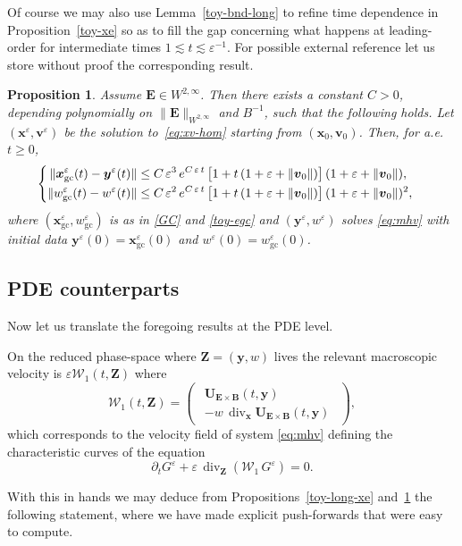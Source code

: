 \documentclass[10pt]{amsart}
\let\mathcal\mathscr
\newenvironment{splitcases}
{\begin{cases}\begin{aligned}}
{\end{aligned}\end{cases}}
\let\eps\varepsilon
\let\d\partial
\DeclareMathOperator{\Div}{div}
\theoremstyle{plain}
\newtheorem{proposition}[theorem]{Proposition}
\theoremstyle{definition}
\newcommand\bp{\begin{pmatrix}}
\newcommand\ep{\end{pmatrix}}
\newcommand{\be}{\begin{equation}}
\newcommand{\ee}{\end{equation}}
\newcommand{\ba}[1]{\begin{array}{#1}}
\newcommand{\ea}{\end{array}}
\newcommand{\bpr}{\begin{proposition}}
\newcommand{\epr}{\end{proposition}}
\newcommand\bB{{\boldsymbol B}}
\newcommand\bE{{\boldsymbol E}}
\newcommand\bU{{\boldsymbol U}}
\newcommand\bfv{{\boldsymbol v}}
\newcommand\bfx{{\boldsymbol x}}
\newcommand\bfy{{\boldsymbol y}}
\newcommand\bfZ{{\boldsymbol Z}}
\newcommand\cW{{\mathcal W}}
\let\e w
\newcommand{\GC}{\bfx_\mathrm{gc}}
\newcommand{\eGC}{w_\mathrm{gc}}
\newcommand{\EcB}{\bU_{\bE\times\bB}}
\begin{document}
Of course we may also use Lemma~\ref{toy-bnd-long} to refine time dependence in Proposition~\ref{toy-xe} so as to fill the gap concerning what happens at leading-order for intermediate times $1\lesssim t\lesssim \eps^{-1}$. For possible external reference let us store without proof the corresponding result.

\bpr
\label{toy-bis-xe}
Assume $\bE\in W^{2,\infty}$. Then there exists a constant $C>0$, depending
polynomially on $\|\bE\|_{W^{2,\infty}}$ and $B^{-1}$, such that the following holds. Let
$(\bfx^\eps,\bfv^\eps)$ be the solution to~\eqref{eq:xv-hom} starting from
$(\bfx_0,\bfv_0)$. Then, for a.e. $t\geq0$,
\[
\begin{splitcases}
\|\GC^\eps(t)-\bfy^\eps(t)\| &\leq C\,\eps^3\,e^{C\,\eps\,t}
\,\bigl[1+t\,(1+\eps+\|\bfv_0\|)\bigr]\,(1+\eps+\|\bfv_0\|),
\\
\|\eGC^\eps(t)-\e^\eps(t)\|&\leq C\,\eps^2\,e^{C\,\eps\,t}\,
\bigl[1+t\,(1+\eps+\|\bfv_0\|)\bigr]\,(1+\eps+\|\bfv_0\|)^2,
\end{splitcases}
\]
where $(\GC^\eps,\eGC^\eps)$ is as in \eqref{GC} and \eqref{toy-egc} and $(\bfy^\eps,\e^\eps)$ solves \eqref{eq:mhv} with initial data $\bfy^\eps(0)=\GC^\eps(0)$ and
$\e^\eps(0)=\eGC^\eps(0)$.
\epr

\subsection{PDE counterparts}

Now let us translate the foregoing results at the PDE level.

On the reduced phase-space where $\bfZ=(\bfy,\e)$ lives the relevant macroscopic velo\-city is $\eps\cW_1(t,\bfZ)$ where
\be
\label{eq:gc2d-1}
\cW_1(t,\bfZ)
= \bp
\ba{l}
\EcB(t,\bfy)
\\[3pt]
-\e \,\Div_{\bfx}\EcB(t,\bfy)
\ea
\ep,
\ee
which corresponds to the velocity field of system \eqref{eq:mhv} defining the characteristic curves of the equation
\be
\label{eq:gc2d-2}
\d_t G^\eps+\eps\,\Div_\bfZ \left(\cW_1\,G^\eps\right)=0.
\ee

With this in hands we may deduce from Propositions~\ref{toy-long-xe} and~\ref{toy-bis-xe} the following statement, where we have made explicit push-forwards that were easy to compute.
\end{document}
